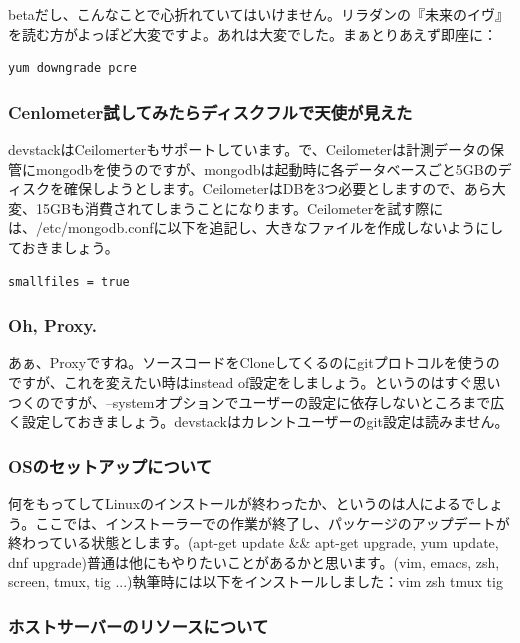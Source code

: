 \documentclass[9pt,b5paper,tombo,openany,dvipdfmx]{jsbook}
\begin{document}
betaだし、こんなことで心折れていてはいけません。リラダンの『未来のイヴ』を読む方がよっぽど大変ですよ。あれは大変でした。まぁとりあえず即座に：

\begin{lstlisting}
yum downgrade pcre
\end{lstlisting}

\subsubsection{Cenlometer試してみたらディスクフルで天使が見えた}

devstackはCeilomerterもサポートしています。で、Ceilometerは計測データの保管にmongodbを使うのですが、mongodbは起動時に各データベースごと5GBのディスクを確保しようとします。CeilometerはDBを3つ必要としますので、あら大変、15GBも消費されてしまうことになります。Ceilometerを試す際には、/etc/mongodb.confに以下を追記し、大きなファイルを作成しないようにしておきましょう。

\begin{lstlisting}
smallfiles = true
\end{lstlisting}

\subsubsection{Oh, Proxy.}

あぁ、Proxyですね。ソースコードをCloneしてくるのにgitプロトコルを使うのですが、これを変えたい時はinstead of設定をしましょう。というのはすぐ思いつくのですが、--systemオプションでユーザーの設定に依存しないところまで広く設定しておきましょう。devstackはカレントユーザーのgit設定は読みません。

\subsubsection{OSのセットアップについて}

何をもってしてLinuxのインストールが終わったか、というのは人によるでしょう。ここでは、インストーラーでの作業が終了し、パッケージのアップデートが終わっている状態とします。(apt-get update \&\& apt-get upgrade, yum update, dnf upgrade)普通は他にもやりたいことがあるかと思います。(vim, emacs, zsh, screen, tmux, tig ...)執筆時には以下をインストールしました：vim zsh tmux tig

\subsubsection{ホストサーバーのリソースについて}
\end{document}
